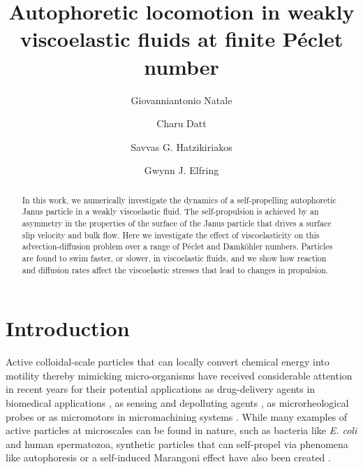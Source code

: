 \documentclass[aps,pre,reprint,twocolumn,notitlepage,superscriptaddress]{revtex4-1}
\begin{document}
\title{Autophoretic locomotion in weakly viscoelastic fluids at finite P\'eclet number}
\author{Giovanniantonio Natale}
\author{Charu Datt}
\author{Savvas G. Hatzikiriakos}
\author{Gwynn J. Elfring}


\begin{abstract}
In this work, we numerically investigate the dynamics of a self-propelling autophoretic Janus particle in a weakly viscoelastic fluid. The self-propulsion is achieved by an asymmetry in the properties of the surface of the Janus particle that drives a surface slip velocity and bulk flow. Here we investigate the effect of viscoelasticity on this advection-diffusion problem over a range of P\'eclet and Damk\"ohler numbers. Particles are found to swim faster, or slower, in viscoelastic fluids, and we show how reaction and diffusion rates affect the viscoelastic stresses that lead to changes in propulsion.
\end{abstract}

\maketitle

\section{Introduction}
Active colloidal-scale particles that can locally convert chemical energy into motility thereby mimicking micro-organisms \citep{Def_AC} have received considerable attention in recent years for their potential applications as drug-delivery agents in biomedical applications  \citep{nelson2010microrobots}, as sensing and depolluting agents \citep{soler2013self, li2014water}, as microrheological probes \citep{behrend2004brownian} or as micromotors in micromachining systems  \citep{maggi2016self}. While many examples of active particles at microscales can be found in nature, such as bacteria like \emph{E. coli} and human spermatozoa, synthetic particles that can self-propel via phenomena like autophoresis or a self-induced Marangoni effect have also been created \citep{Stark_2016}. 
 
\end{document}
